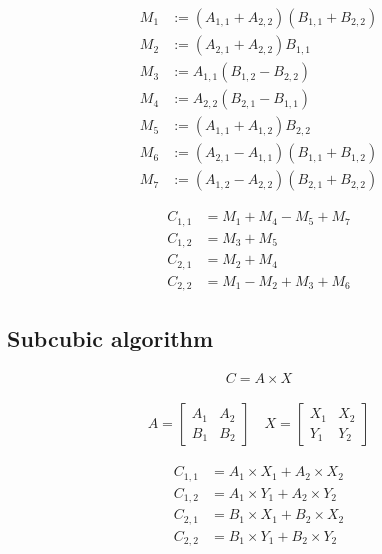 \documentclass[a4paper,11pt]{article}
\begin{document}

\begin{align*}
M_{1} &:= (A_{1,1} + A_{2,2})(B_{1,1} + B_{2,2}) \\
M_{2} &:= (A_{2,1} + A_{2,2})B_{1,1} \\
M_{3} &:= A_{1,1}(B_{1,2} - B_{2,2}) \\
M_{4} &:= A_{2,2}(B_{2,1} - B_{1,1}) \\
M_{5} &:= (A_{1,1} + A_{1,2})B_{2,2} \\
M_{6} &:= (A_{2,1} - A_{1,1})(B_{1,1} + B_{1,2}) \\
M_{7} &:= (A_{1,2} - A_{2,2})(B_{2,1} + B_{2,2})
\end{align*}

\begin{align*}
C_{1,1} &= M_{1} + M_{4} - M_{5} + M_{7} \\
C_{1,2} &= M_{3} + M_{5} \\
C_{2,1} &= M_{2} + M_{4} \\
C_{2,2} &= M_{1} - M_{2} + M_{3} + M_{6}
\end{align*}

\subsection{Subcubic algorithm}

\begin{align*}
C = A \times X
\end{align*}

\begin{align*}
A = 
\begin{bmatrix}
A_{1} & A_{2} \\
B_{1} & B_{2}
\end{bmatrix}
\quad
X = 
\begin{bmatrix}
X_{1} & X_{2} \\
Y_{1} & Y_{2}
\end{bmatrix}
\end{align*}

\begin{align*}
C_{1,1} &= A_{1} \times X_{1} + A_{2}  \times X_{2} \\
C_{1,2} &= A_{1} \times Y_{1} + A_{2}  \times Y_{2} \\
C_{2,1} &= B_{1} \times X_{1} + B_{2}  \times X_{2} \\
C_{2,2} &= B_{1} \times Y_{1} + B_{2}  \times Y_{2}
\end{align*}
\end{document}
